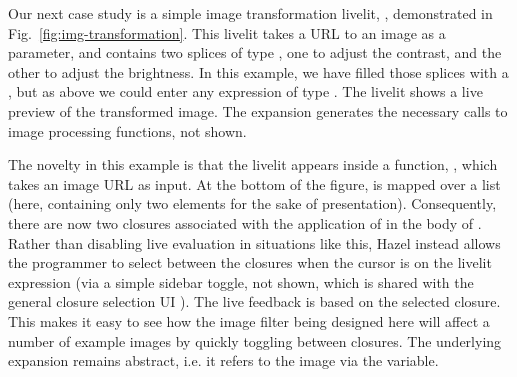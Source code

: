 Our next case study is a simple image transformation livelit, ,
demonstrated in Fig.~\ref{fig:img-transformation}. This livelit takes 
a URL to an image as a parameter, and contains two splices of type ,
one to adjust the contrast, and the other to adjust the brightness.
In this example, we have filled those splices with a , but 
as above we could enter any expression of type .
The livelit shows a live preview of the transformed image.
The expansion generates the necessary calls to image processing functions, 
not shown.

The novelty in this example is that the livelit appears inside a function, 
, which takes an image URL as input. At the bottom 
of the figure,  is mapped over a list (here, containing only 
two elements for the sake of presentation). Consequently, there are now 
two closures associated with the application of  in the 
body of . Rather than disabling live evaluation in situations like 
this, Hazel instead allows the programmer to select between the closures when 
the cursor is on the livelit expression (via a simple sidebar toggle, not shown, which is shared 
with the general closure selection UI \cite{HazelnutLive}). 
The live feedback is based on the selected closure.
This makes it easy to see how the image filter being designed here will affect a
number of example images by quickly toggling between closures. The underlying expansion remains abstract, i.e. it refers to the image via the  variable.


